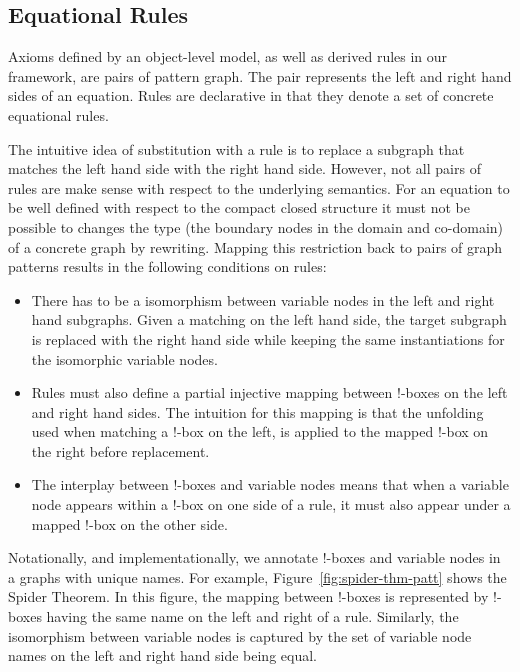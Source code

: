 \documentclass[runningheads]{llncs}
\begin{document}
\subsection{Equational Rules}

Axioms defined by an object-level model, as well as derived rules in
our framework, are pairs of pattern graph. The pair represents the
left and right hand sides of an equation. Rules are declarative in
that they denote a set of concrete equational rules. 

The intuitive idea of substitution with a rule is to replace a
subgraph that matches the left hand side with the right hand side.
However, not all pairs of rules are make sense with respect to the
underlying semantics. For an equation to be well defined with respect
to the compact closed structure it must not be possible to changes the
type (the boundary nodes in the domain and co-domain) of a concrete
graph by rewriting.  Mapping this restriction back to pairs of graph
patterns results in the following conditions on rules:

\begin{itemize}

\item There has to be a isomorphism between variable nodes in the left
  and right hand subgraphs. Given a matching on the left hand side,
  the target subgraph is replaced with the right hand side while
  keeping the same instantiations for the isomorphic variable nodes.

\item Rules must also define a partial injective mapping between
  !-boxes on the left and right hand sides. The intuition for this
  mapping is that the unfolding used when matching a !-box on the
  left, is applied to the mapped !-box on the right before
  replacement.

\item The interplay between !-boxes and variable nodes means that when
  a variable node appears within a !-box on one side of a rule, it must
  also appear under a mapped !-box on the other side.

\end{itemize}

Notationally, and implementationally, we annotate !-boxes and variable
nodes in a graphs with unique names. For example,
Figure~\ref{fig:spider-thm-patt} shows the Spider Theorem. In this
figure, the mapping between !-boxes is represented by !-boxes having
the same name on the left and right of a rule.  Similarly, the
isomorphism between variable nodes is captured by the set of variable
node names on the left and right hand side being equal.
\end{document}
